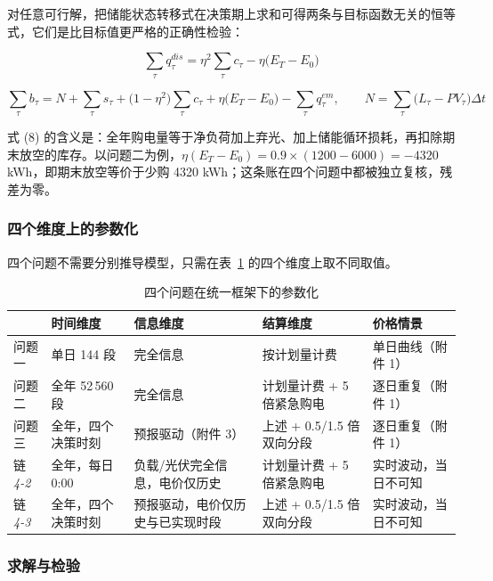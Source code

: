 对任意可行解，把储能状态转移式在决策期上求和可得两条与目标函数无关的恒等式，它们是比目标值更严格的正确性检验：

\begin{equation}
\sum_{\tau}q^{dis}_{\tau}=\eta^2\sum_{\tau}c_{\tau}-\eta\bigl(E_{T}-E_{0}\bigr)
\end{equation}

\begin{equation}
\sum_{\tau}b_{\tau}=N+\sum_{\tau}s_{\tau}+\bigl(1-\eta^2\bigr)\sum_{\tau}c_{\tau}
+\eta\bigl(E_{T}-E_{0}\bigr)-\sum_{\tau}q^{em}_{\tau},
\qquad N=\sum_{\tau}\bigl(L_{\tau}-PV_{\tau}\bigr)\Delta t
\end{equation}

式 (8) 的含义是：全年购电量等于净负荷加上弃光、加上储能循环损耗，再扣除期末放空的库存。以问题二为例，$\eta(E_T-E_0)=0.9\times(1200-6000)=-4320$ kWh，即期末放空等价于少购 4320 kWh；这条账在四个问题中都被独立复核，残差为零。

\subsubsection{四个维度上的参数化}

四个问题不需要分别推导模型，只需在表~\ref{tab:param} 的四个维度上取不同取值。

\begin{table}[htbp]
\centering
\footnotesize
\caption{四个问题在统一框架下的参数化}
\label{tab:param}
\begin{tabular}{p{1.4cm}p{2.4cm}p{3.4cm}p{3.6cm}p{2.6cm}}
\toprule
 & 时间维度 & 信息维度 & 结算维度 & 价格情景 \\
\midrule
问题一 & 单日 144 段 & 完全信息 & 按计划量计费 & 单日曲线（附件 1） \\
问题二 & 全年 52\,560 段 & 完全信息 & 计划量计费 + 5 倍紧急购电 & 逐日重复（附件 1） \\
问题三 & 全年，四个决策时刻 & 预报驱动（附件 3） & 上述 + 0.5/1.5 倍双向分段 & 逐日重复（附件 1） \\
链 \emph{4-2} & 全年，每日 0:00 & 负载/光伏完全信息，电价仅历史 & 计划量计费 + 5 倍紧急购电 & 实时波动，当日不可知 \\
链 \emph{4-3} & 全年，四个决策时刻 & 预报驱动，电价仅历史与已实现时段 & 上述 + 0.5/1.5 倍双向分段 & 实时波动，当日不可知 \\
\bottomrule
\end{tabular}
\end{table}

\subsubsection{求解与检验}

